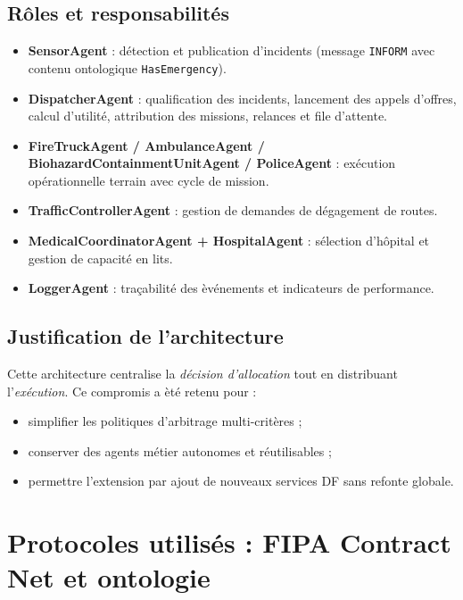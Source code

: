 \documentclass[12pt,a4paper]{article}
\begin{document}
\subsection{R\^oles et responsabilit\'es}
\begin{itemize}
    \item \textbf{SensorAgent} : d\'etection et publication d'incidents (message \texttt{INFORM} avec contenu ontologique \texttt{HasEmergency}).
    \item \textbf{DispatcherAgent} : qualification des incidents, lancement des appels d'offres, calcul d'utilit\'e, attribution des missions, relances et file d'attente.
    \item \textbf{FireTruckAgent / AmbulanceAgent / BiohazardContainmentUnitAgent / PoliceAgent} : ex\'ecution op\'erationnelle terrain avec cycle de mission.
    \item \textbf{TrafficControllerAgent} : gestion de demandes de d\'egagement de routes.
    \item \textbf{MedicalCoordinatorAgent + HospitalAgent} : s\'election d'h\^opital et gestion de capacit\'e en lits.
    \item \textbf{LoggerAgent} : tra\c{c}abilit\'e des \`ev\'enements et indicateurs de performance.
\end{itemize}

\subsection{Justification de l'architecture}
Cette architecture centralise la \textit{d\'ecision d'allocation} tout en distribuant l'\textit{ex\'ecution}. Ce compromis a \`et\'e retenu pour :
\begin{itemize}
    \item simplifier les politiques d'arbitrage multi-crit\`eres ;
    \item conserver des agents m\'etier autonomes et r\'eutilisables ;
    \item permettre l'extension par ajout de nouveaux services DF sans refonte globale.
\end{itemize}

\section{Protocoles utilis\'es : FIPA Contract Net et ontologie}
\end{document}
